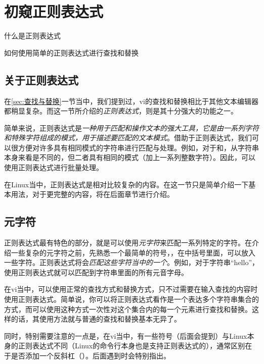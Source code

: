 \section{初窥正则表达式}\label{sec:初窥正则表达式}

\begin{Abstract}
    \item 什么是正则表达式
    \item 如何使用简单的正则表达式进行查找和替换
\end{Abstract}

\subsection{关于正则表达式}\label{subsec:初窥正则表达式-关于正则表达式}

在\ref{sec:查找与替换}一节当中，我们提到过，vi的查找和替换相比于其他文本编辑器都稍显复杂。而这一节所介绍的\emph{正则表达式}，则是其十分强大的功能之一。

简单来说，正则表达式是\emph{一种用于匹配和操作文本的强大工具，它是由一系列字符和特殊字符组成的模式，用于描述要匹配的文本模式}。借助于正则表达式，我们可以很方便对许多具有相同模式的字符串进行匹配与处理。例如，对于和，从字符串本身来看是不同的，但二者具有相同的模式（加上一系列整数字符）。因此，可以使用正则表达式进行批量处理。

在Linux当中，正则表达式是相对比较复杂的内容。在这一节只是简单介绍一下基本用法，对于更完整的内容，将在后面章节进行介绍。

\subsection{元字符}\label{subsec:正则表达式-元字符}

正则表达式最有特色的部分，就是可以使用\emph{元字符}来匹配一系列特定的字符。在介绍一些复杂的元字符之前，先熟悉一个最简单的符号，\code{[]}，在中括号里面，可以放入一些字符。正则表达式将会\emph{匹配这些字符当中的一个}。例如，对于字符串“hello”，使用正则表达式\code{[aeiou]}就可以匹配到字符串里面的所有元音字母。

\begin{attention}
    在vi当中，可以使用正常的查找方式和替换方式，只不过需要在输入查找的内容时使用正则表达式。简单说，你可以将正则表达式看作是一个表达多个字符串集合的方式，而可以使用这种方式一次性对这个集合内的每一个元素进行查找和替换。这样的话，其使用方法就与普通的查找和替换基本无异了。

    同时，特别需要注意的一点是，在vi当中，有一些符号（后面会提到）与Linux本身的正则表达式不同（Linux的命令行本身也是支持正则表达式的），通常区别在于是否添加一个反斜杠（\code{$\backslash$}）。后面遇到时会特别指出。
\end{attention}

